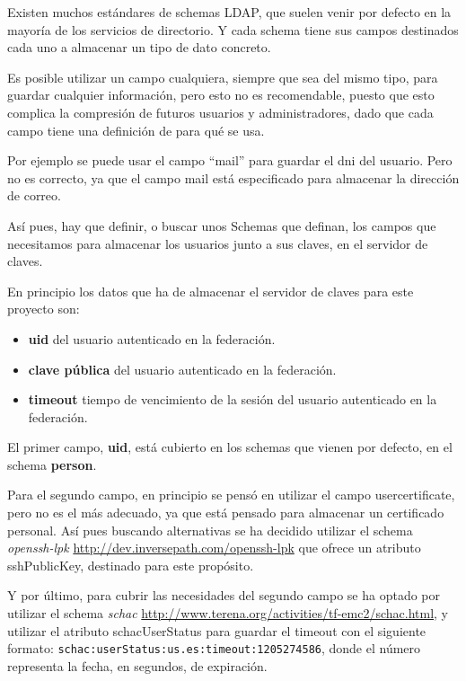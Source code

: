     Existen muchos estándares de schemas LDAP, que suelen venir por defecto
    en la mayoría de los servicios de directorio. Y cada schema tiene sus
    campos destinados cada uno a almacenar un tipo de dato concreto.

    Es posible utilizar un campo cualquiera, siempre que sea del mismo
    tipo, para guardar cualquier información, pero esto no es recomendable,
    puesto que esto complica la compresión de futuros usuarios y
    administradores, dado que cada campo tiene una definición de para qué
    se usa.

    Por ejemplo se puede usar el campo ``mail'' para guardar el dni del
    usuario. Pero no es correcto, ya que el campo mail está especificado
    para almacenar la dirección de correo.

    Así pues, hay que definir, o buscar unos Schemas que definan, los
    campos que necesitamos para almacenar los usuarios junto a sus claves,
    en el servidor de claves.

    En principio los datos que ha de almacenar el servidor de claves para
    este proyecto son:

    \begin{itemize}

    \item \textbf{uid} del usuario autenticado en la federación.
    \item \textbf{clave pública} del usuario autenticado en la federación.
    \item \textbf{timeout} tiempo de vencimiento de la sesión del usuario autenticado en la federación.

    \end{itemize}

    El primer campo, \textbf{uid}, está cubierto en los schemas que vienen
    por defecto, en el schema \textbf{person}.

    Para el segundo campo, en principio se pensó en utilizar el campo
    usercertificate, pero no es el más adecuado, ya que está pensado para
    almacenar un certificado personal. Así pues buscando alternativas se ha
    decidido utilizar el schema \textit{openssh-lpk}
    \url{http://dev.inversepath.com/openssh-lpk} que ofrece un atributo
    sshPublicKey, destinado para este propósito.

    Y por último, para cubrir las necesidades del segundo campo se ha
    optado por utilizar el schema \textit{schac}
    \url{http://www.terena.org/activities/tf-emc2/schac.html}, y utilizar
    el atributo schacUserStatus para guardar el timeout con el siguiente
    formato: \texttt{schac:userStatus:us.es:timeout:1205274586}, donde el
    número representa la fecha, en segundos, de expiración.

